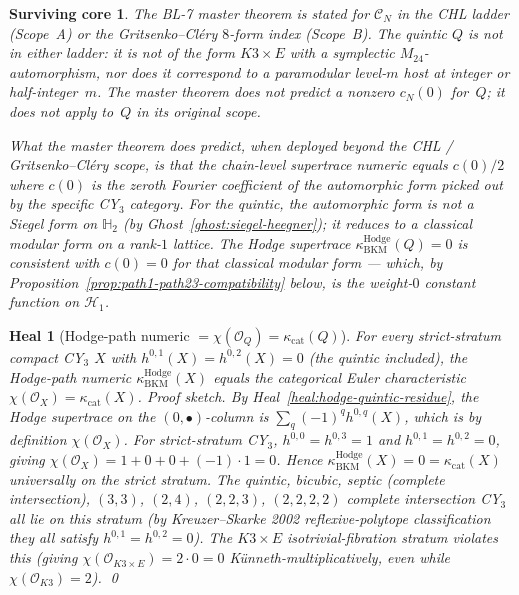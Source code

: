 \documentclass[11pt]{amsart}
\newtheorem{surviving}[theorem]{Surviving core}
\newtheorem{heal}[theorem]{Heal}
\providecommand{\cC}{\mathcal{C}}
\providecommand{\cO}{\mathcal{O}}
\providecommand{\kBKM}{\kappa_{\mathrm{BKM}}}
\providecommand{\kcat}{\kappa_{\mathrm{cat}}}
\providecommand{\Hdg}{\mathrm{Hodge}}
\begin{document}
\begin{surviving}
\label{surv:quintic-not-in-chl-scope}
The BL-7 master theorem is stated for $\cC_N$ in the CHL ladder
(Scope~A) or the Gritsenko--Cl\'ery $8$-form index (Scope~B). The
quintic $Q$ is \emph{not} in either ladder: it is not of the form
$K3 \times E$ with a symplectic $M_{24}$-automorphism, nor does it
correspond to a paramodular level-$m$ host at integer or
half-integer~$m$. The master theorem does not predict a nonzero
$c_N(0)$ for~$Q$; it does not apply to~$Q$ in its original scope.

What the master theorem \emph{does} predict, when deployed beyond
the CHL / Gritsenko--Cl\'ery scope, is that the chain-level
supertrace numeric equals $c(0)/2$ where $c(0)$ is the zeroth
Fourier coefficient of the automorphic form picked out by the
specific CY$_3$ category. For the quintic, the automorphic form
is \emph{not} a Siegel form on $\mathbb{H}_2$ (by
Ghost~\ref{ghost:siegel-heegner}); it reduces to a classical
modular form on a rank-$1$ lattice. The Hodge supertrace
$\kBKM^{\Hdg}(Q) = 0$ is consistent with $c(0) = 0$ for that
classical modular form --- which, by Proposition~\ref{prop:path1-path23-compatibility}
below, is the weight-$0$ constant function on $\mathcal{H}_1$.
\end{surviving}

\begin{heal}[Hodge-path numeric $= \chi(\cO_Q) = \kcat(Q)$]
\label{heal:hodge-path-equals-chi}
For every strict-stratum compact CY$_3$ $X$ with $h^{0,1}(X) =
h^{0,2}(X) = 0$ (the quintic included), the Hodge-path numeric
$\kBKM^{\Hdg}(X)$ equals the categorical Euler characteristic
$\chi(\cO_X) = \kcat(X)$.
\emph{Proof sketch.} By Heal~\ref{heal:hodge-quintic-residue}, the
Hodge supertrace on the $(0, \bullet)$-column is
$\sum_q (-1)^q h^{0,q}(X)$, which is by definition $\chi(\cO_X)$.
For strict-stratum CY$_3$, $h^{0,0} = h^{0,3} = 1$ and
$h^{0,1} = h^{0,2} = 0$, giving $\chi(\cO_X) = 1 + 0 + 0 + (-1) \cdot 1 = 0$.
Hence $\kBKM^{\Hdg}(X) = 0 = \kcat(X)$ universally on the strict stratum.
The quintic, bicubic, septic (complete intersection), $(3,3)$, $(2,4)$,
$(2,2,3)$, $(2,2,2,2)$ complete intersection CY$_3$ all lie on this
stratum (by Kreuzer--Skarke 2002 reflexive-polytope classification
they all satisfy $h^{0,1} = h^{0,2} = 0$). The $K3 \times E$
isotrivial-fibration stratum violates this (giving
$\chi(\cO_{K3 \times E}) = 2 \cdot 0 = 0$ K\"unneth-multiplicatively,
even while $\chi(\cO_{K3}) = 2$).
\qed
\end{heal}
\end{document}

